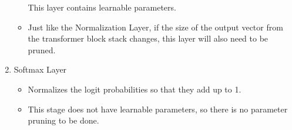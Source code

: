 \documentclass{article}
\begin{document}
\begin{enumerate}
\begin{itemize}
            This layer contains learnable parameters.
            \item Just like the Normalization Layer, if the size of the output vector from the transformer block stack changes, this layer will also need to be pruned.
        \end{itemize}
        \item Softmax Layer
        \begin{itemize}
            \item Normalizes the logit probabilities so that they add up to 1.
            \item This stage does not have learnable parameters, so there is no parameter pruning to be done.
        \end{itemize}
    \end{enumerate}
\end{document}
